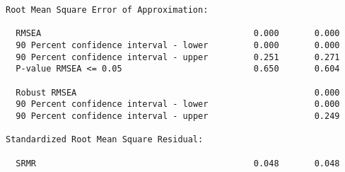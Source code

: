 \begin{verbatim}
Root Mean Square Error of Approximation:

  RMSEA                                          0.000       0.000
  90 Percent confidence interval - lower         0.000       0.000
  90 Percent confidence interval - upper         0.251       0.271
  P-value RMSEA <= 0.05                          0.650       0.604
                                                                  
  Robust RMSEA                                               0.000
  90 Percent confidence interval - lower                     0.000
  90 Percent confidence interval - upper                     0.249

Standardized Root Mean Square Residual:

  SRMR                                           0.048       0.048
\end{verbatim}
